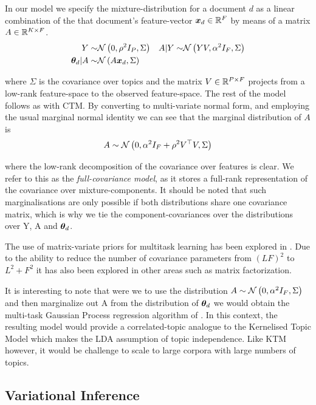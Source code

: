 In our model we specify the mixture-distribution for a document $d$ as a linear combination of the that document's feature-vector ${ \bm x_d } \in { \mathbb{R}^{F} }$ by means of a matrix $A \in { \mathbb{R}^{K \times F} }$.
\begin{align}
Y \sim & \mathcal{N} \left(0, \rho^2 I_P, \Sigma\right) & A|Y \sim & \mathcal{N} \left(YV, \alpha^2 I_F, \Sigma\right) \\
{ \bm \theta_d } | A \sim & \mathcal{N} \left( {A\bm x_d}, {\Sigma} \right)
\end{align}

where $\Sigma$ is the covariance over topics and the matrix $V \in { \mathbb{R}^{P \times F} }$ projects from a low-rank feature-space to the observed feature-space. The rest of the model follows as with CTM. By converting to multi-variate normal form, and employing the usual marginal normal identity\cite{Bishop2006}  we can see that the marginal distribution of $A$ is
\begin{equation}
A \sim \mathcal{N} \left(0, \alpha^2 I_F + \rho^2 V^\top V, \Sigma\right)
\end{equation}

where the low-rank decomposition of the covariance over features is clear. We refer to this as the \emph{full-covariance model}, as it stores a full-rank representation of the covariance over mixture-components. It should be noted that such marginalisations are only possible if both distributions share one covariance matrix, which is why we tie the component-covariances over the distributions over Y, A and ${ \bm \theta_d }$. 

The use of matrix-variate priors for multitask learning has been explored in \cite{Stegle2011}\cite{Bonilla2008} \cite{Archambeau2011}\cite{Yang2011}. Due to the ability to reduce the number of covariance parameters from $(LF)^2$ to $L^2 + F^2$ it has also been explored in other areas such as matrix factorization\cite{Allen2010}.

It is interesting to note that were we to use the distribution $A \sim \mathcal{N} \left(0, \alpha^2 I_F, \Sigma\right)$ and then marginalize out A from the distribution of ${ \bm \theta_d }$ we would obtain the multi-task Gaussian Process regression algorithm of \cite{Bonilla2008}. In this context, the resulting model would provide a correlated-topic analogue to the Kernelised Topic Model \cite{Hennig2012} which makes the LDA assumption of topic independence. Like KTM however, it would be challenge to scale to large corpora with large numbers of topics.

\subsection{Variational Inference}
\newcommand \onek { \one_K }
\newcommand \md { \vv{m}_d }
\newcommand \Vd { V^{(d)} }


